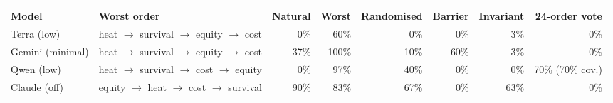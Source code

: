 \begin{adjustbox}{max width=\linewidth}
\begin{tabular}{@{}llrrrrrr@{}}
\toprule
Model & Worst order & Natural & Worst & Randomised & Barrier & Invariant & 24-order vote \\
\midrule
Terra (low) & heat $\to$ survival $\to$ equity $\to$ cost & 0\% & 60\% & 0\% & 0\% & 3\% & 0\% \\
Gemini (minimal) & heat $\to$ survival $\to$ equity $\to$ cost & 37\% & 100\% & 10\% & 60\% & 3\% & 0\% \\
Qwen (low) & heat $\to$ survival $\to$ cost $\to$ equity & 0\% & 97\% & 40\% & 0\% & 0\% & 70\% (70\% cov.) \\
Claude (off) & equity $\to$ heat $\to$ cost $\to$ survival & 90\% & 83\% & 67\% & 0\% & 63\% & 0\% \\
\bottomrule
\end{tabular}
\end{adjustbox}

\par{}
